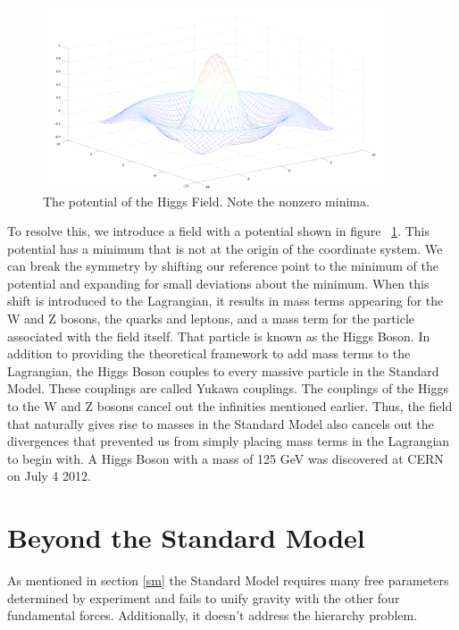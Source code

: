 \documentclass[oneside, letterpaper, oldfontcommands]{memoir}
\begin{document}
\begin{figure}[here]
\includegraphics[width=0.9\textwidth]{HiggsPotential.png}
\caption{The potential of the Higgs Field. Note the nonzero minima.}
\label{fig:HiggsPotential}
\end{figure}

\qquad To resolve this, we introduce a field with a potential shown in figure ~\ref{fig:HiggsPotential}. This potential has a minimum that is not at the origin of the coordinate system. We can break the symmetry by shifting our reference point to the minimum of the potential and expanding for small deviations about the minimum. When this shift is introduced to the Lagrangian, it results in mass terms appearing for the W and Z bosons, the quarks and leptons, and a mass term for the particle associated with the field itself. That particle is known as the Higgs Boson. In addition to providing the theoretical framework to add mass terms to the Lagrangian, the Higgs Boson couples to every massive particle in the Standard Model. These couplings are called Yukawa couplings. The couplings of the Higgs to the W and Z bosons cancel out the infinities mentioned earlier.\cite{Halzen:1984mc} Thus, the field that naturally gives rise to masses in the Standard Model also cancels out the divergences that prevented us from simply placing mass terms in the Lagrangian to begin with. A Higgs Boson with a mass of 125 GeV was discovered at CERN on July 4 2012. \cite{Agashe:2014kda}
 

\section{Beyond the Standard Model}\label{BSM}

\qquad As mentioned in section \ref{sm} the Standard Model requires many free parameters determined by experiment and fails to unify gravity with the other four fundamental forces. Additionally, it doesn't address the hierarchy problem\cite{ArkaniHamed:1998rs}. 
\end{document}
